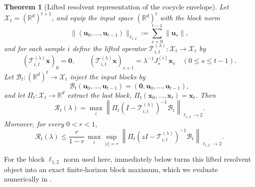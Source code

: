 \documentclass{article}
\newtheorem{theorem}{Theorem}
\theoremstyle{remark}
\newcommand{\R}{\mathbb{R}}
\begin{document}
\begin{theorem}[Lifted resolvent representation of the cocycle envelope]
\label{thm:lifted_resolvent}
Let $\mathcal{X}_t = (\R^d)^{t+1}$, and equip the input space $(\R^d)^t$ with the block norm
\[
  \|(\mathbf{u}_0,\dots,\mathbf{u}_{t-1})\|_{\ell_{1,2}}
  := \sum_{s=0}^{t-1}\|\mathbf{u}_s\|,
\]
and for each sample $i$ define the lifted operator
$\mathcal{T}_{i,t}^{(\lambda)} : \mathcal{X}_t \to \mathcal{X}_t$ by
\[
  (\mathcal{T}_{i,t}^{(\lambda)}\mathbf{x})_0 = \mathbf{0},
  \qquad
  (\mathcal{T}_{i,t}^{(\lambda)}\mathbf{x})_{s+1}
  = \lambda^{-1} J_s^{(i)} \mathbf{x}_s
  \quad (0 \leq s \leq t-1).
\]
Let $\mathcal{B}_t : (\R^d)^t \to \mathcal{X}_t$ inject the input blocks by
\[
  \mathcal{B}_t(\mathbf{u}_0,\dots,\mathbf{u}_{t-1})
  = (\mathbf{0},\mathbf{u}_0,\dots,\mathbf{u}_{t-1}),
\]
and let $\Pi_t : \mathcal{X}_t \to \R^d$ extract the last block,
$\Pi_t(\mathbf{x}_0,\dots,\mathbf{x}_t)=\mathbf{x}_t$. Then
\begin{equation}
  \mathcal{R}_t(\lambda)
  = \max_i
  \left\|
    \Pi_t (I - \mathcal{T}_{i,t}^{(\lambda)})^{-1}\mathcal{B}_t
  \right\|_{\ell_{1,2}\to 2}.
  \label{eq:lifted_resolvent_rep}
\end{equation}
Moreover, for every $0<r<1$,
\begin{equation}
  \mathcal{R}_t(\lambda)
  \leq \frac{r}{1-r}\,
  \max_i \sup_{|z|=r}
  \left\|
    \Pi_t (zI - \mathcal{T}_{i,t}^{(\lambda)})^{-1}\mathcal{B}_t
  \right\|_{\ell_{1,2}\to 2}.
  \label{eq:lifted_resolvent_bound}
\end{equation}
\end{theorem}

For the block $\ell_{1,2}$ norm used here, 
immediately below turns this lifted resolvent object into an exact
finite-horizon block maximum, which we evaluate numerically in
.
\end{document}
